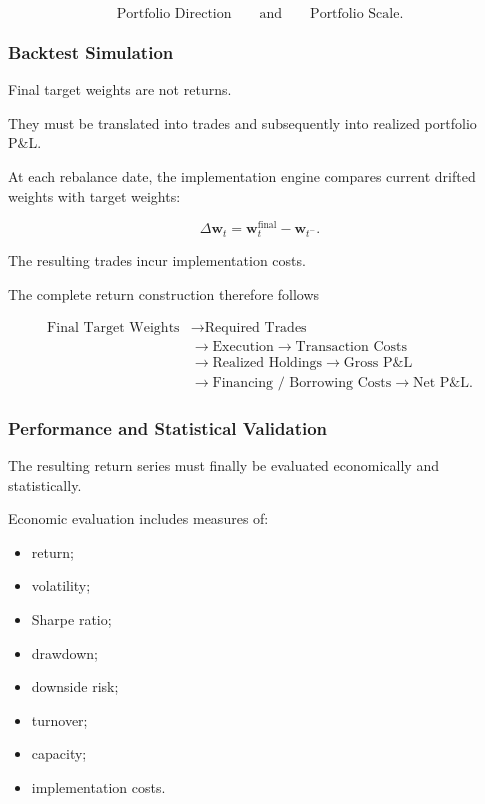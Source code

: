 \documentclass[11pt,a4paper]{article}
\begin{document}
\begin{equation}
\boxed{
\text{Portfolio Direction}
\qquad\text{and}\qquad
\text{Portfolio Scale}.
}
\end{equation}


\subsubsection{Backtest Simulation}

Final target weights are not returns.

They must be translated into trades and subsequently into realized portfolio
P\&L.

At each rebalance date, the implementation engine compares current drifted
weights with target weights:

\begin{equation}
\Delta\mathbf{w}_t
=
\mathbf{w}_t^{\mathrm{final}}
-
\mathbf{w}_{t^-}.
\end{equation}

The resulting trades incur implementation costs.

The complete return construction therefore follows

\begin{equation}
\boxed{
\begin{aligned}
\text{Final Target Weights}
&\rightarrow
\text{Required Trades}
\\
&\rightarrow
\text{Execution}
\rightarrow
\text{Transaction Costs}
\\
&\rightarrow
\text{Realized Holdings}
\rightarrow
\text{Gross P\&L}
\\
&\rightarrow
\text{Financing / Borrowing Costs}
\rightarrow
\text{Net P\&L}.
\end{aligned}
}
\end{equation}


\subsubsection{Performance and Statistical Validation}

The resulting return series must finally be evaluated economically and
statistically.

Economic evaluation includes measures of:

\begin{itemize}
    \item return;
    \item volatility;
    \item Sharpe ratio;
    \item drawdown;
    \item downside risk;
    \item turnover;
    \item capacity;
    \item implementation costs.
\end{itemize}
\end{document}
